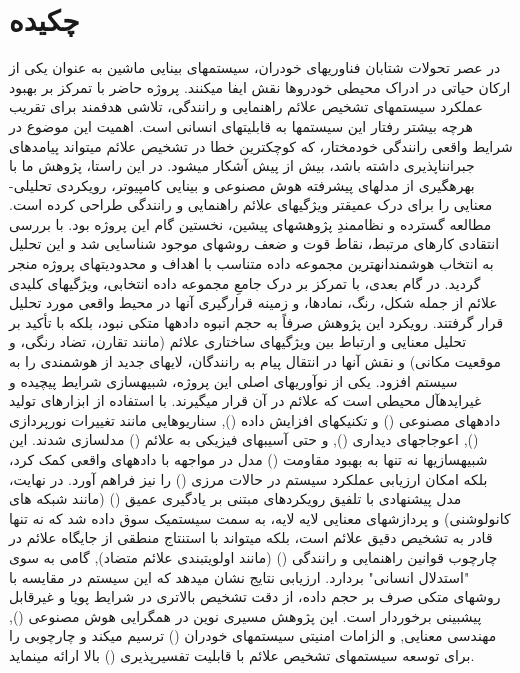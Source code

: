 \chapter{چکیده}
  
در عصر تحولات شتابان فناوریهای خودران، سیستمهای بینایی ماشین به عنوان یکی از ارکان حیاتی در ادراک محیطی خودروها نقش ایفا میکنند. پروژه حاضر با تمرکز بر بهبود عملکرد سیستمهای تشخیص علائم راهنمایی و رانندگی، تلاشی هدفمند برای تقریب هرچه بیشتر رفتار این سیستمها به قابلیتهای انسانی است. اهمیت این موضوع در شرایط واقعی رانندگی خودمختار، که کوچکترین خطا در تشخیص علائم میتواند پیامدهای جبرانناپذیری داشته باشد، بیش از پیش آشکار میشود. در این راستا، پژوهش ما با بهرهگیری از مدلهای پیشرفته هوش مصنوعی و بینایی کامپیوتر، رویکردی تحلیلی-معنایی را برای درک عمیقتر ویژگیهای علائم راهنمایی و رانندگی طراحی کرده است. 
مطالعه گسترده و نظاممندِ پژوهشهای پیشین، نخستین گام این پروژه بود. با بررسی انتقادی کارهای مرتبط، نقاط قوت و ضعف روشهای موجود شناسایی شد و این تحلیل به انتخاب هوشمندانهترین مجموعه داده متناسب با اهداف و محدودیتهای پروژه منجر گردید. در گام بعدی، با تمرکز بر درک جامعِ مجموعه داده انتخابی، ویژگیهای کلیدی علائم از جمله شکل، رنگ، نمادها، و زمینه قرارگیری آنها در محیط واقعی مورد تحلیل قرار گرفتند. رویکرد این پژوهش صرفاً به حجم انبوه دادهها متکی نبود، بلکه با تأکید بر تحلیل معنایی و ارتباط بین ویژگیهای ساختاری علائم (مانند تقارن، تضاد رنگی، و موقعیت مکانی) و نقش آنها در انتقال پیام به رانندگان، لایهای جدید از هوشمندی را به سیستم افزود. 
یکی از نوآوریهای اصلی این پروژه، شبیهسازی شرایط پیچیده و غیرایدهآل محیطی است که علائم در آن قرار میگیرند. با استفاده از ابزارهای تولید دادههای مصنوعی () و تکنیکهای افزایش داده (), سناریوهایی مانند تغییرات نورپردازی (), اعوجاجهای دیداری (), و حتی آسیبهای فیزیکی به علائم () مدلسازی شدند. این شبیهسازیها نه تنها به بهبود مقاومت () مدل در مواجهه با دادههای واقعی کمک کرد، بلکه امکان ارزیابی عملکرد سیستم در حالات مرزی () را نیز فراهم آورد. 
در نهایت، مدل پیشنهادی با تلفیق رویکردهای مبتنی بر یادگیری عمیق () (مانند شبکه های کانولوشنی) و پردازشهای معنایی لایه لایه، به سمت سیستمیک سوق داده شد که نه تنها قادر به تشخیص دقیق علائم است، بلکه میتواند با استنتاج منطقی از جایگاه علائم در چارچوب قوانین راهنمایی و رانندگی () (مانند اولویتبندی علائم متضاد), گامی به سوی "استدلال انسانی" بردارد. ارزیابی نتایج نشان میدهد که این سیستم در مقایسه با روشهای متکی صرف بر حجم داده، از دقت تشخیص بالاتری در شرایط پویا و غیرقابل پیشبینی برخوردار است. این پژوهش مسیری نوین در همگرایی هوش مصنوعی (), مهندسی معنایی, و الزامات امنیتی سیستمهای خودران () ترسیم میکند و چارچوبی را برای توسعه سیستمهای تشخیص علائم با قابلیت تفسیرپذیری () بالا ارائه مینماید. 
  
  
  
  